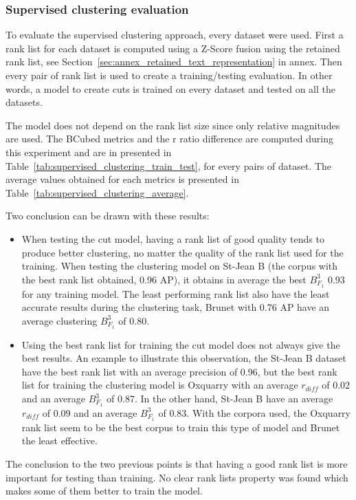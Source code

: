 \subsubsection{Supervised clustering evaluation}

To evaluate the supervised clustering approach, every dataset were used.
First a rank list for each dataset is computed using a Z-Score fusion using the retained rank list, see Section~\ref{sec:annex_retained_text_representation} in annex.
Then every pair of rank list is used to create a training/testing evaluation.
In other words, a model to create cuts is trained on every dataset and tested on all the datasets.

The model does not depend on the rank list size since only relative magnitudes are used.
The BCubed metrics and the r ratio difference are computed during this experiment and are in presented in Table~\ref{tab:supervised_clustering_train_test}, for every pairs of dataset.
The average values obtained for each metrics is presented in Table~\ref{tab:supervised_clustering_average}.

Two conclusion can be drawn with these results:
\begin{itemize}
  \item
  When testing the cut model, having a rank list of good quality tends to produce better clustering, no matter the quality of the rank list used for the training.
  When testing the clustering model on St-Jean B (the corpus with the best rank list obtained, 0.96 AP), it obtains in average the best $B^3_{F_1}$ 0.93 for any training model.
  The least performing rank list also have the least accurate results during the clustering task, Brunet with 0.76 AP have an average clustering $B^3_{F_1}$ of 0.80.
  \item
  Using the best rank list for training the cut model does not always give the best results.
  An example to illustrate this observation, the St-Jean B dataset have the best rank list with an average precision of 0.96, but the best rank list for training the clustering model is Oxquarry with an average $r_{diff}$ of 0.02 and an average $B^3_{F_1}$ of 0.87.
  In the other hand, St-Jean B have an average $r_{diff}$ of 0.09 and an average $B^3_{F_1}$ of 0.83.
  With the corpora used, the Oxquarry rank list seem to be the best corpus to train this type of model and Brunet the least effective.
\end{itemize}

The conclusion to the two previous points is that having a good rank list is more important for testing than training.
No clear rank lists property was found which makes some of them better to train the model.

